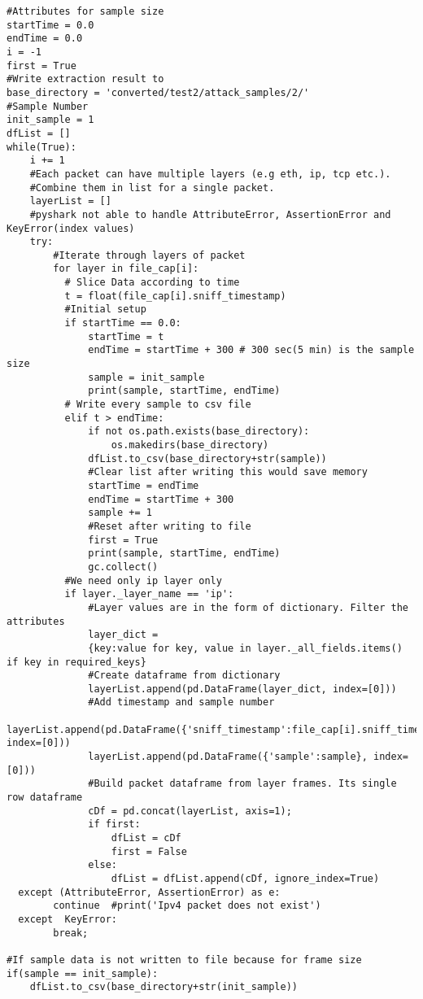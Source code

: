 \documentclass{article}
\begin{document}
\begin{verbatim}
#Attributes for sample size
startTime = 0.0
endTime = 0.0
i = -1
first = True
#Write extraction result to
base_directory = 'converted/test2/attack_samples/2/'
#Sample Number
init_sample = 1
dfList = []
while(True):
    i += 1
    #Each packet can have multiple layers (e.g eth, ip, tcp etc.).
    #Combine them in list for a single packet.
    layerList = []
    #pyshark not able to handle AttributeError, AssertionError and KeyError(index values)
    try:
        #Iterate through layers of packet
        for layer in file_cap[i]:
          # Slice Data according to time
          t = float(file_cap[i].sniff_timestamp)
          #Initial setup
          if startTime == 0.0:
              startTime = t
              endTime = startTime + 300 # 300 sec(5 min) is the sample size
              sample = init_sample
              print(sample, startTime, endTime)
          # Write every sample to csv file
          elif t > endTime:
              if not os.path.exists(base_directory):
                  os.makedirs(base_directory)
              dfList.to_csv(base_directory+str(sample))
              #Clear list after writing this would save memory
              startTime = endTime
              endTime = startTime + 300
              sample += 1
              #Reset after writing to file
              first = True
              print(sample, startTime, endTime)
              gc.collect()
          #We need only ip layer only
          if layer._layer_name == 'ip':
              #Layer values are in the form of dictionary. Filter the attributes
              layer_dict =
              {key:value for key, value in layer._all_fields.items() if key in required_keys}
              #Create dataframe from dictionary
              layerList.append(pd.DataFrame(layer_dict, index=[0]))
              #Add timestamp and sample number
              layerList.append(pd.DataFrame({'sniff_timestamp':file_cap[i].sniff_timestamp}, index=[0]))
              layerList.append(pd.DataFrame({'sample':sample}, index=[0]))
              #Build packet dataframe from layer frames. Its single row dataframe
              cDf = pd.concat(layerList, axis=1);
              if first:
                  dfList = cDf
                  first = False
              else:
                  dfList = dfList.append(cDf, ignore_index=True)
  except (AttributeError, AssertionError) as e:
        continue  #print('Ipv4 packet does not exist')
  except  KeyError:
        break;

#If sample data is not written to file because for frame size
if(sample == init_sample):
    dfList.to_csv(base_directory+str(init_sample))

\end{verbatim}
\pagebreak
\end{document}
